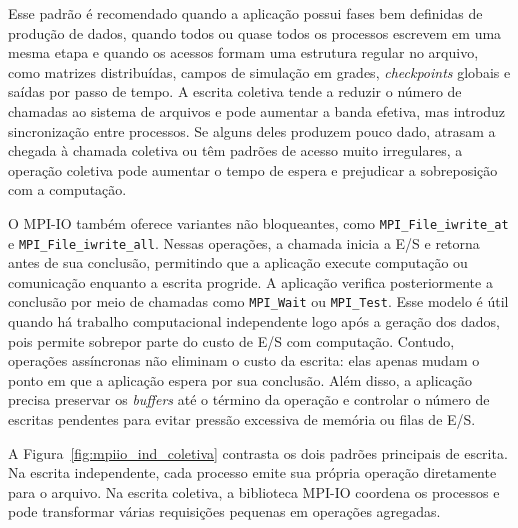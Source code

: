 Esse padrão é recomendado quando a aplicação possui fases bem definidas de
produção de dados, quando todos ou quase todos os processos escrevem em uma
mesma etapa e quando os acessos formam uma estrutura regular no arquivo,
como matrizes distribuídas, campos de simulação em grades, \textit{checkpoints}
globais e saídas por passo de tempo. A escrita coletiva tende a reduzir o
número de chamadas ao sistema de arquivos e pode aumentar a banda efetiva,
mas introduz sincronização entre processos. Se alguns deles
produzem pouco dado, atrasam a chegada à chamada coletiva ou têm padrões de
acesso muito irregulares, a operação coletiva pode aumentar o tempo de
espera e prejudicar a sobreposição com a computação.

O MPI-IO também oferece variantes não bloqueantes, como
\texttt{MPI\_File\_iwrite\_at} e \texttt{MPI\_File\_iwrite\_all}. Nessas
operações, a chamada inicia a E/S e retorna antes de sua conclusão, permitindo
que a aplicação execute computação ou comunicação enquanto a escrita progride.
A aplicação verifica posteriormente a conclusão por meio de chamadas como
\texttt{MPI\_Wait} ou \texttt{MPI\_Test}. Esse modelo é útil quando há
trabalho computacional independente logo após a geração dos dados, pois
permite sobrepor parte do custo de E/S com computação. Contudo, operações
assíncronas não eliminam o custo da escrita: elas apenas mudam o ponto em
que a aplicação espera por sua conclusão. Além disso, a aplicação precisa
preservar os \textit{buffers} até o término da operação e controlar o número
de escritas pendentes para evitar pressão excessiva de memória ou filas de
E/S.

A Figura~\ref{fig:mpiio_ind_coletiva} contrasta os dois padrões principais
de escrita. Na escrita independente, cada processo emite sua própria
operação diretamente para o arquivo. Na escrita coletiva, a biblioteca MPI-IO
coordena os processos e pode transformar várias requisições pequenas em
operações agregadas.

